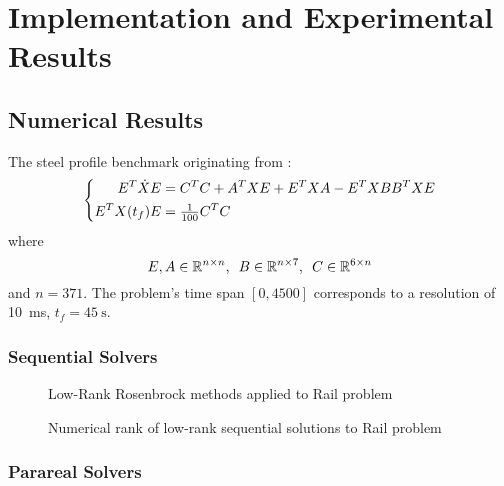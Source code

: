 \chapter{Implementation and Experimental Results}
\label{sec:results}




\section{Numerical Results}


\begin{example}
The steel profile benchmark \cite{morwiki_steel} originating from \cite{Benner2005}:
\label{thm:results:rail}
\begin{equation}
\left\{
\begin{aligned}
  E^T \dot X E &= C^T C + A^T X E + E^T X A - E^T X BB^T X E \\
  E^T X(t_f) E &= \tfrac{1}{100} C^T C
\end{aligned}
\right.
\end{equation}
where
\begin{equation}
  E, A \in \mathbb{R}^{n\times n},
  \enspace
  B \in \mathbb{R}^{n \times 7},
  \enspace
  C \in \mathbb{R}^{6 \times n}
\end{equation}
and $n=371$.
The problem's time span $[0,4500]$ corresponds to a resolution of \SI{10}{\milli\second},
\ie $t_f = \SI{45}{\second}$.
\end{example}

\subsection{Sequential Solvers}

\begin{figure}[t]
  \caption{Low-Rank Rosenbrock methods applied to Rail problem}
\end{figure}

\begin{figure}[t]
  \caption{Numerical rank of low-rank sequential solutions to Rail problem}
\end{figure}

\subsection{Parareal Solvers}
\label{sec:results:parareal}

